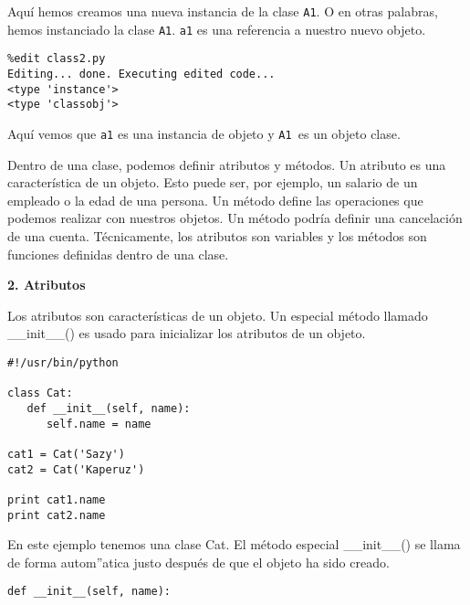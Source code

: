 \documentclass[twoside,10.5pt]{article}%
\begin{document}
\vspace{0.3cm}

Aqu\'i hemos creamos una nueva instancia de la  clase \texttt{A1}. O en otras palabras, hemos instanciado la clase \texttt{A1}. \texttt{a1} es una referencia a nuestro nuevo objeto.

\vspace{0.3cm}

\begin{verbatim}
%edit class2.py
Editing... done. Executing edited code...
<type 'instance'>
<type 'classobj'>
\end{verbatim}

\vspace{0.3cm}

Aqu\'i vemos que \texttt{a1} es una instancia de objeto  y \texttt{A1 }es un objeto clase.


Dentro de una clase, podemos definir  atributos y m\'etodos. Un atributo es una caracter\'istica de un objeto. Esto puede ser, por ejemplo, un salario de un empleado o la edad de una persona. Un m\'etodo define las operaciones que podemos realizar con nuestros objetos. Un método podría definir una cancelaci\'on de una cuenta. T\'ecnicamente, los atributos son variables y los  m\'etodos son funciones definidas dentro de una clase.

\vspace{0.3cm}

\textbf{2. Atributos}

Los atributos son caracter\'isticas de un objeto. Un especial m\'etodo llamado {\color{red}\_\_init\_\_()} es usado para inicializar los atributos de un objeto.

\vspace{0.3cm}

\begin{verbatim}
#!/usr/bin/python

class Cat:
   def __init__(self, name):
      self.name = name

cat1 = Cat('Sazy')
cat2 = Cat('Kaperuz')

print cat1.name
print cat2.name
\end{verbatim}

\vspace{0.3cm}

En este ejemplo tenemos una clase Cat. El m\'etodo especial {\color{red}\_\_init\_\_()} se llama de forma autom''atica justo despu\'es de que el objeto ha sido creado.


\begin{verbatim}
def __init__(self, name):
\end{verbatim}
\end{document}
